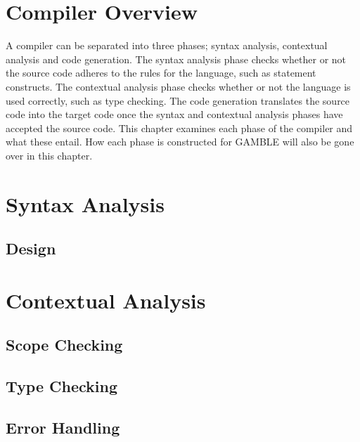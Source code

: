 \chapter{Compiler Overview}
A compiler can be separated into three phases; syntax analysis, contextual analysis and code generation.
The syntax analysis phase checks whether or not the source code adheres to the rules for the language, such as statement constructs.
The contextual analysis phase checks whether or not the language is used correctly, such as type checking.
The code generation translates the source code into the target code once the syntax and contextual analysis phases have accepted the source code.
This chapter examines each phase of the compiler and what these entail.
How each phase is constructed for GAMBLE will also be gone over in this chapter. %



\chapter{Syntax Analysis}
\section{Design}









\chapter{Contextual Analysis}



\section{Scope Checking}


\section{Type Checking}


\section{Error Handling}




